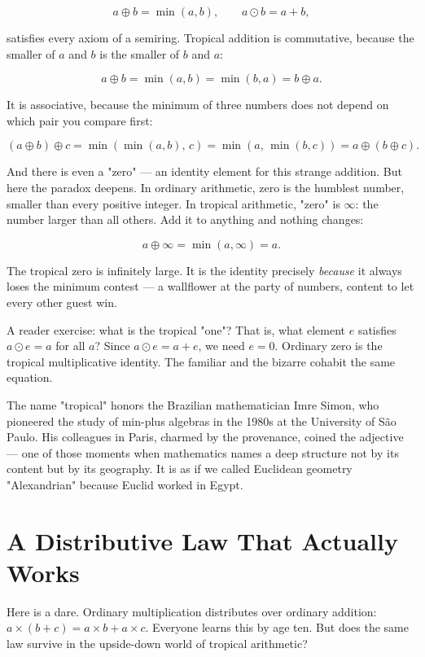 \documentclass[11pt,openright,twoside]{book}
\theoremstyle{definition}
\begin{document}
\[a \oplus b = \min(a, b), \qquad a \odot b = a + b,\]

satisfies every axiom of a semiring. Tropical addition is commutative, because the smaller of $a$ and $b$ is the smaller of $b$ and $a$:

\[a \oplus b = \min(a,b) = \min(b,a) = b \oplus a.\]

It is associative, because the minimum of three numbers does not depend on which pair you compare first:

\[(a \oplus b) \oplus c = \min(\min(a,b),\, c) = \min(a,\, \min(b,c)) = a \oplus (b \oplus c).\]

And there is even a "zero" --- an identity element for this strange addition. But here the paradox deepens. In ordinary arithmetic, zero is the humblest number, smaller than every positive integer. In tropical arithmetic, "zero" is $\infty$: the number larger than all others. Add it to anything and nothing changes:

\[a \oplus \infty = \min(a, \infty) = a.\]

The tropical zero is infinitely large. It is the identity precisely \textit{because} it always loses the minimum contest --- a wallflower at the party of numbers, content to let every other guest win.

A reader exercise: what is the tropical "one"? That is, what element $e$ satisfies $a \odot e = a$ for all $a$? Since $a \odot e = a + e$, we need $e = 0$. Ordinary zero is the tropical multiplicative identity. The familiar and the bizarre cohabit the same equation.

The name "tropical" honors the Brazilian mathematician Imre Simon, who pioneered the study of min-plus algebras in the 1980s at the University of São Paulo. His colleagues in Paris, charmed by the provenance, coined the adjective --- one of those moments when mathematics names a deep structure not by its content but by its geography. It is as if we called Euclidean geometry "Alexandrian" because Euclid worked in Egypt.


\bigskip


\section{A Distributive Law That Actually Works}

Here is a dare. Ordinary multiplication distributes over ordinary addition: $a \times (b + c) = a \times b + a \times c$. Everyone learns this by age ten. But does the same law survive in the upside-down world of tropical arithmetic?
\end{document}
